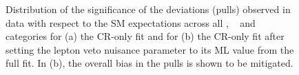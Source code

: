 \begin{figure}[!tbhp]
  \begin{center}
  \end{center}
  \caption{
  Distribution of the significance of the deviations (pulls) observed in data with respect
  to the SM expectations across all \njet, \nb~ and \scalht categories 
  for (a) the CR-only fit and for (b) the CR-only fit after setting 
  the lepton veto nuisance parameter to its ML value from the full fit. 
  In (b), the overall bias in the pulls is shown to be mitigated.}
\end{figure}

